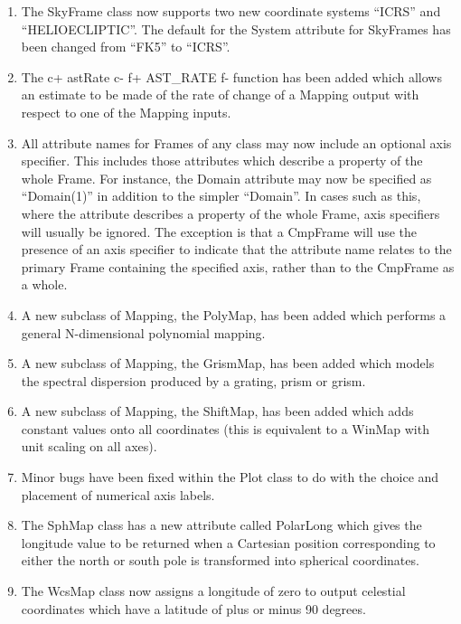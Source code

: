 \documentclass[twoside,11pt]{starlink}
\begin{document}
\begin{enumerate}
\item The SkyFrame class now supports two new coordinate systems ``ICRS''
and ``HELIOECLIPTIC''. The default for the System attribute for SkyFrames
has been changed from ``FK5'' to ``ICRS''.

\item The
c+
astRate
c-
f+
AST\_RATE
f-
function has been added which allows an estimate to be made of the rate of
change of a Mapping output with respect to one of the Mapping inputs.

\item All attribute names for Frames of any class may now include an optional
axis specifier. This includes those attributes which describe a property
of the whole Frame. For instance, the Domain attribute may now be
specified as ``Domain(1)'' in addition to the simpler ``Domain''. In cases
such as this, where the attribute describes a property of the whole
Frame, axis specifiers will usually be ignored. The exception is that a
CmpFrame will use the presence of an axis specifier to indicate that the
attribute name relates to the primary Frame containing the specified
axis, rather than to the CmpFrame as a whole.

\item A new subclass of Mapping, the PolyMap, has been added which
performs a general N-dimensional polynomial mapping.

\item A new subclass of Mapping, the GrismMap, has been added which
models the spectral dispersion produced by a grating, prism or grism.

\item A new subclass of Mapping, the ShiftMap, has been added which adds
constant values onto all coordinates (this is equivalent to a WinMap
with unit scaling on all axes).

\item Minor bugs have been fixed within the Plot class to do with the choice
and placement of numerical axis labels.

\item The SphMap class has a new attribute called PolarLong which gives the
longitude value to be returned when a Cartesian position corresponding to
either the north or south pole is transformed into spherical coordinates.

\item The WcsMap class now assigns a longitude of zero to output
celestial coordinates which have a latitude of plus or minus 90 degrees.


\end{enumerate}
\end{document}
